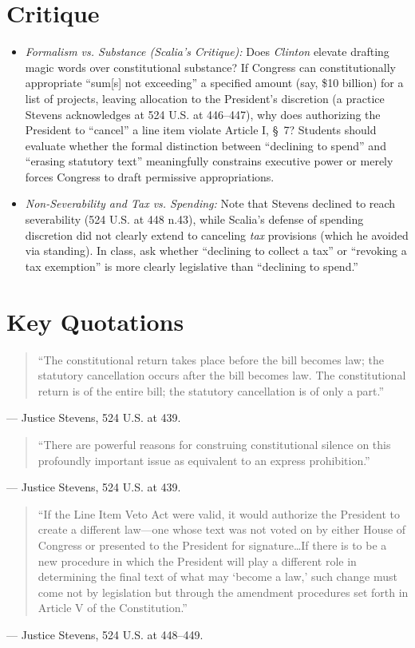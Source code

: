 \documentclass[12pt]{article}
\begin{document}
\section{Critique}
\begin{itemize}
  \item \textit{Formalism vs. Substance (Scalia's Critique):} Does \textit{Clinton} elevate drafting magic words over constitutional substance? If Congress can constitutionally appropriate ``sum[s] not exceeding'' a specified amount (say, \$10 billion) for a list of projects, leaving allocation to the President's discretion (a practice Stevens acknowledges at 524 U.S. at 446--447), why does authorizing the President to ``cancel'' a line item violate Article I, \S~7? Students should evaluate whether the formal distinction between ``declining to spend'' and ``erasing statutory text'' meaningfully constrains executive power or merely forces Congress to draft permissive appropriations.
  \item \textit{Non-Severability and Tax vs. Spending:} Note that Stevens declined to reach severability (524 U.S. at 448 n.43), while Scalia's defense of spending discretion did not clearly extend to canceling \emph{tax} provisions (which he avoided via standing). In class, ask whether ``declining to collect a tax'' or ``revoking a tax exemption'' is more clearly legislative than ``declining to spend.''
\end{itemize}

\section{Key Quotations}
\begin{quote}
``The constitutional return takes place before the bill becomes law; the statutory cancellation occurs after the bill becomes law. The constitutional return is of the entire bill; the statutory cancellation is of only a part.''
\end{quote}
\noindent --- Justice Stevens, 524 U.S. at 439.

\begin{quote}
``There are powerful reasons for construing constitutional silence on this profoundly important issue as equivalent to an express prohibition.''
\end{quote}
\noindent --- Justice Stevens, 524 U.S. at 439.

\begin{quote}
``If the Line Item Veto Act were valid, it would authorize the President to create a different law---one whose text was not voted on by either House of Congress or presented to the President for signature\ldots If there is to be a new procedure in which the President will play a different role in determining the final text of what may `become a law,' such change must come not by legislation but through the amendment procedures set forth in Article V of the Constitution.''
\end{quote}
\noindent --- Justice Stevens, 524 U.S. at 448--449.
\end{document}
